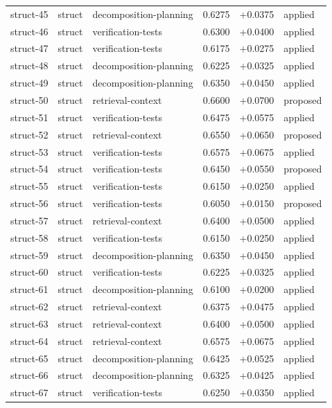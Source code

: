 \begin{center}
\begin{longtable}{llp{5.2cm}rrl}
struct-45 & struct & decomposition-planning & 0.6275 & +0.0375 & applied \\
struct-46 & struct & verification-tests & 0.6300 & +0.0400 & applied \\
struct-47 & struct & verification-tests & 0.6175 & +0.0275 & applied \\
struct-48 & struct & decomposition-planning & 0.6225 & +0.0325 & applied \\
struct-49 & struct & decomposition-planning & 0.6350 & +0.0450 & applied \\
struct-50 & struct & retrieval-context & 0.6600 & +0.0700 & proposed \\
struct-51 & struct & verification-tests & 0.6475 & +0.0575 & applied \\
struct-52 & struct & retrieval-context & 0.6550 & +0.0650 & proposed \\
struct-53 & struct & verification-tests & 0.6575 & +0.0675 & applied \\
struct-54 & struct & verification-tests & 0.6450 & +0.0550 & proposed \\
struct-55 & struct & verification-tests & 0.6150 & +0.0250 & applied \\
struct-56 & struct & verification-tests & 0.6050 & +0.0150 & proposed \\
struct-57 & struct & retrieval-context & 0.6400 & +0.0500 & applied \\
struct-58 & struct & verification-tests & 0.6150 & +0.0250 & applied \\
struct-59 & struct & decomposition-planning & 0.6350 & +0.0450 & applied \\
struct-60 & struct & verification-tests & 0.6225 & +0.0325 & applied \\
struct-61 & struct & decomposition-planning & 0.6100 & +0.0200 & applied \\
struct-62 & struct & retrieval-context & 0.6375 & +0.0475 & applied \\
struct-63 & struct & retrieval-context & 0.6400 & +0.0500 & applied \\
struct-64 & struct & retrieval-context & 0.6575 & +0.0675 & applied \\
struct-65 & struct & decomposition-planning & 0.6425 & +0.0525 & applied \\
struct-66 & struct & decomposition-planning & 0.6325 & +0.0425 & applied \\
struct-67 & struct & verification-tests & 0.6250 & +0.0350 & applied \\

\end{longtable}
\end{center}
